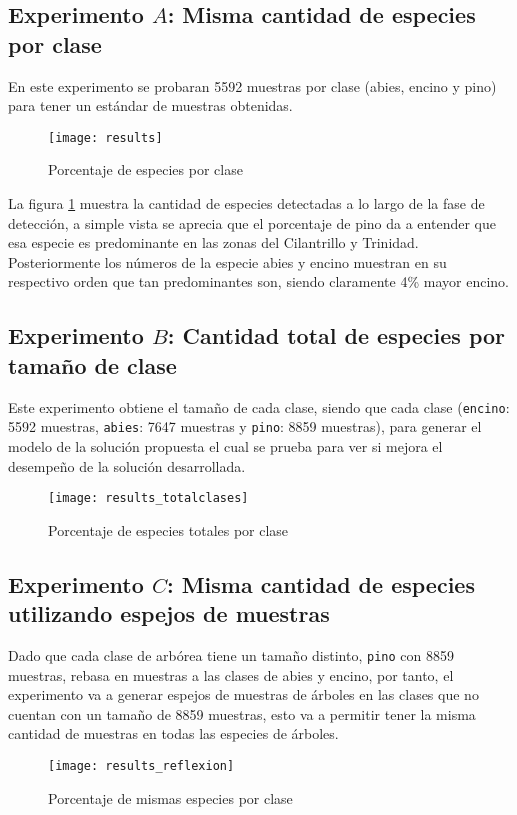 \subsection{Experimento $A$: Misma cantidad de especies por clase}
En este experimento se probaran 5592 muestras por clase (abies, encino y pino) para tener un estándar de muestras obtenidas.

\begin{figure}[h!]
  \centering  
        \texttt{[image: results]}
    \caption{Porcentaje de especies por clase} 
        \label{Porcentaje de especies por clase}
\end{figure}

La figura \ref{Porcentaje de especies por clase} muestra la cantidad de especies detectadas a lo largo de la fase de detección, a simple vista se aprecia que el porcentaje de pino da a entender que esa especie es predominante en las zonas del Cilantrillo y Trinidad. Posteriormente los números de la especie abies y encino muestran en su respectivo orden que tan predominantes son, siendo claramente 4\% mayor encino.

\subsection{Experimento $B$: Cantidad total de especies por tamaño de clase}
Este experimento obtiene el tamaño de cada clase, siendo que cada clase (\texttt{encino}: 5592 muestras, \texttt{abies}: 7647 muestras y \texttt{pino}: 8859 muestras), para generar el modelo de la solución propuesta el cual se prueba para ver si mejora el desempeño de la solución desarrollada.

\begin{figure}[h!]
  \centering  
    \texttt{[image: results\_totalclases]}
    \caption{Porcentaje de especies totales por clase} 
    \label{Porcentaje de especies totales por clase}
\end{figure}

\clearpage
\subsection{Experimento $C$: Misma cantidad de especies utilizando espejos de muestras}
Dado que cada clase  de arbórea tiene un tamaño distinto, \texttt{pino} con 8859 muestras, rebasa en muestras a las clases de abies  y encino, por tanto, el experimento va a generar espejos de muestras de árboles  en las clases que no cuentan con un tamaño de 8859 muestras, esto va a permitir tener la misma cantidad de muestras en todas las especies de árboles. 
\begin{figure}[h!]
  \centering  
    \texttt{[image: results\_reflexion]}
    \caption{Porcentaje de mismas especies por clase} 
    \label{Porcentaje de mismas especies por clase}
\end{figure}

